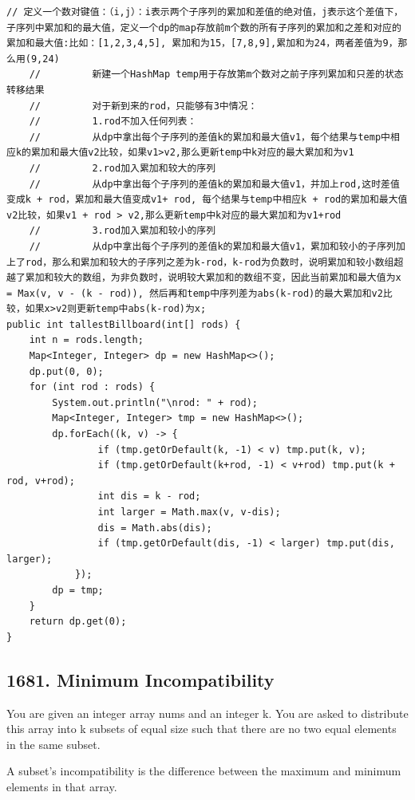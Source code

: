 \documentclass[9pt, b5paper]{article}
\begin{document}
\begin{verbatim}
// 定义一个数对键值：（i,j）：i表示两个子序列的累加和差值的绝对值，j表示这个差值下，子序列中累加和的最大值，定义一个dp的map存放前m个数的所有子序列的累加和之差和对应的累加和最大值:比如：[1,2,3,4,5], 累加和为15，[7,8,9],累加和为24，两者差值为9，那么用(9,24)
    //         新建一个HashMap temp用于存放第m个数对之前子序列累加和只差的状态转移结果
    //         对于新到来的rod，只能够有3中情况：
    //         1.rod不加入任何列表：
    //         从dp中拿出每个子序列的差值k的累加和最大值v1，每个结果与temp中相应k的累加和最大值v2比较，如果v1>v2,那么更新temp中k对应的最大累加和为v1
    //         2.rod加入累加和较大的序列
    //         从dp中拿出每个子序列的差值k的累加和最大值v1，并加上rod,这时差值变成k + rod，累加和最大值变成v1+ rod, 每个结果与temp中相应k + rod的累加和最大值v2比较，如果v1 + rod > v2,那么更新temp中k对应的最大累加和为v1+rod
    //         3.rod加入累加和较小的序列
    //         从dp中拿出每个子序列的差值k的累加和最大值v1，累加和较小的子序列加上了rod，那么和累加和较大的子序列之差为k-rod，k-rod为负数时，说明累加和较小数组超越了累加和较大的数组，为非负数时，说明较大累加和的数组不变，因此当前累加和最大值为x = Max(v, v - (k - rod)), 然后再和temp中序列差为abs(k-rod)的最大累加和v2比较，如果x>v2则更新temp中abs(k-rod)为x;
public int tallestBillboard(int[] rods) {
    int n = rods.length;
    Map<Integer, Integer> dp = new HashMap<>();
    dp.put(0, 0);
    for (int rod : rods) {
        System.out.println("\nrod: " + rod);
        Map<Integer, Integer> tmp = new HashMap<>();
        dp.forEach((k, v) -> {
                if (tmp.getOrDefault(k, -1) < v) tmp.put(k, v);
                if (tmp.getOrDefault(k+rod, -1) < v+rod) tmp.put(k + rod, v+rod);
                int dis = k - rod;
                int larger = Math.max(v, v-dis);
                dis = Math.abs(dis);
                if (tmp.getOrDefault(dis, -1) < larger) tmp.put(dis, larger);
            });
        dp = tmp;
    }
    return dp.get(0);
}
\end{verbatim}

\subsection{1681. Minimum Incompatibility}
\label{sec-3-7}
You are given an integer array nums​​​ and an integer k. You are asked to distribute this array into k subsets of equal size such that there are no two equal elements in the same subset.

A subset's incompatibility is the difference between the maximum and minimum elements in that array.
\end{document}
